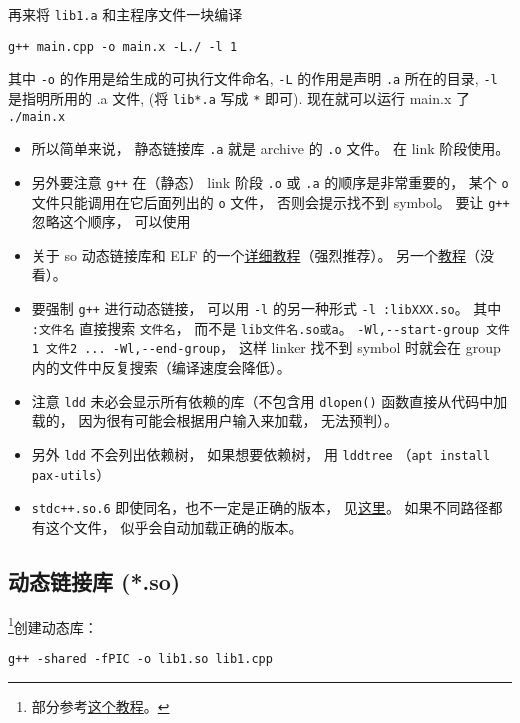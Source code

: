 再来将 \verb|lib1.a| 和主程序文件一块编译
\begin{lstlisting}[language=none]
g++ main.cpp -o main.x -L./ -l 1
\end{lstlisting}

其中 \verb`-o` 的作用是给生成的可执行文件命名, \verb`-L` 的作用是声明 \verb`.a` 所在的目录, \verb`-l` 是指明所用的 .a 文件, (将 \verb`lib*.a` 写成 \verb`*` 即可).
现在就可以运行 main.x 了
\verb`./main.x`

\begin{itemize}
\item 所以简单来说， 静态链接库 \verb`.a` 就是 archive 的 \verb`.o` 文件。 在 link 阶段使用。
\item 另外要注意 \verb`g++` 在（静态） link 阶段 \verb`.o` 或 \verb`.a` 的顺序是非常重要的， 某个 \verb`o` 文件只能调用在它后面列出的 \verb`o` 文件， 否则会提示找不到 symbol。 要让 \verb`g++` 忽略这个顺序， 可以使用
\item 关于 so 动态链接库和 ELF 的一个\href{https://amir.rachum.com/blog/2016/09/17/shared-libraries/}{详细教程}（强烈推荐）。 另一个\href{https://holtstrom.com/michael/blog/post/446/Shared-Library-Symbol-Conflicts-(on-Solaris).html}{教程}（没看）。
\item 要强制 \verb|g++| 进行动态链接， 可以用 \verb|-l| 的另一种形式 \verb|-l :libXXX.so|。 其中 \verb|:文件名| 直接搜索 \verb|文件名|， 而不是 \verb|lib文件名.so或a|。
\verb`-Wl,--start-group 文件1 文件2 ... -Wl,--end-group`， 这样 linker 找不到 symbol 时就会在 group 内的文件中反复搜索（编译速度会降低）。
\item 注意 \verb|ldd| 未必会显示所有依赖的库（不包含用 \verb|dlopen()| 函数直接从代码中加载的， 因为很有可能会根据用户输入来加载， 无法预判）。
\item 另外 \verb|ldd| 不会列出依赖树， 如果想要依赖树， 用 \verb|lddtree| （\verb|apt install pax-utils|）
\item \verb|stdc++.so.6| 即使同名，也不一定是正确的版本， 见\href{https://unix.stackexchange.com/questions/458659/what-do-the-multiple-glibc-versions-mean-in-the-output-of-ldd}{这里}。 如果不同路径都有这个文件， 似乎会自动加载正确的版本。
\end{itemize}

\subsection{动态链接库 (*.so)}
\footnote{部分参考\href{https://amir.rachum.com/blog/2016/09/17/shared-libraries/}{这个教程}。}创建动态库：
\begin{lstlisting}[language=none]
g++ -shared -fPIC -o lib1.so lib1.cpp
\end{lstlisting}

